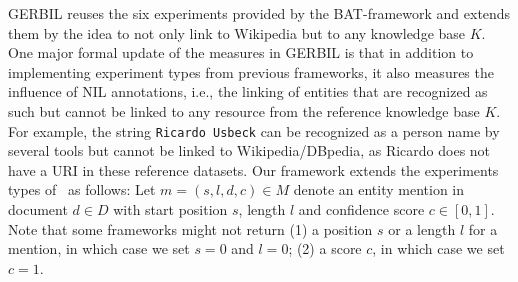 GERBIL reuses the six experiments provided by the BAT-framework and extends them by the idea to not only link to Wikipedia but to any knowledge base $K$.
One major formal update of the measures in GERBIL is that in addition to implementing experiment types from previous frameworks, it also measures the influence of NIL annotations, i.e., the linking of entities that are recognized as such but cannot be linked to any resource from the reference knowledge base $K$. For example, the string \texttt{Ricardo Usbeck} can be recognized as a person name by several tools but cannot be linked to Wikipedia/DBpedia, as Ricardo does not have a URI in these reference datasets. 
Our framework extends the experiments types of~\cite{cornolti} as follows: Let $m=(s,l,d,c) \in M$ denote an entity mention in document $d \in D$ with start position $s$, length $l$ and confidence score $c \in [0,1]$.
Note that some frameworks might not return (1) a position $s$ or a length $l$ for a mention, in which case we set $s=0$ and $l=0$; (2) a score $c$, in which case we set $c=1$.



